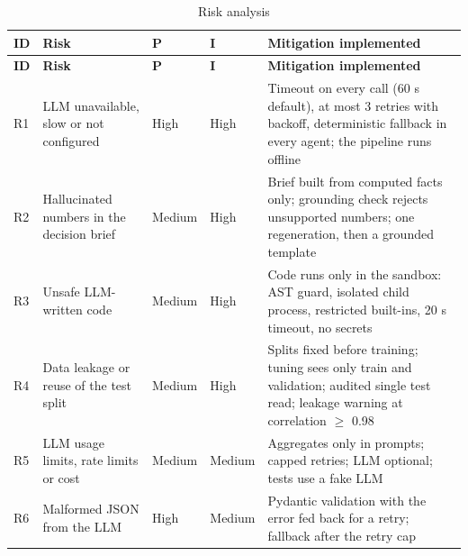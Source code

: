 \begingroup
\linespread{1}\small
\setlength{\tabcolsep}{4pt}
\begin{longtable}{|>{\raggedright\arraybackslash\hspace{0pt}}p{}|>{\raggedright\arraybackslash\hspace{0pt}}p{}|>{\raggedright\arraybackslash\hspace{0pt}}p{}|>{\raggedright\arraybackslash\hspace{0pt}}p{}|>{\raggedright\arraybackslash\hspace{0pt}}p{}|}
\caption{Risk analysis}\label{tab:3.2}\\
\hline
\rowcolor{tableheader}\textbf{ID} & \textbf{Risk} & \textbf{P} & \textbf{I} & \textbf{Mitigation implemented} \\
\hline
\endfirsthead
\hline
\rowcolor{tableheader}\textbf{ID} & \textbf{Risk} & \textbf{P} & \textbf{I} & \textbf{Mitigation implemented} \\
\endhead
R1 & LLM unavailable, slow or not configured & High & High & Timeout on every call (60 s default), at most 3 retries with backoff, deterministic fallback in every agent; the pipeline runs offline \\ \hline
R2 & Hallucinated numbers in the decision brief & Medium & High & Brief built from computed facts only; grounding check rejects unsupported numbers; one regeneration, then a grounded template \\ \hline
R3 & Unsafe LLM-written code & Medium & High & Code runs only in the sandbox: AST guard, isolated child process, restricted built-ins, 20 s timeout, no secrets \\ \hline
R4 & Data leakage or reuse of the test split & Medium & High & Splits fixed before training; tuning sees only train and validation; audited single test read; leakage warning at correlation \ensuremath{\geq} 0.98 \\ \hline
R5 & LLM usage limits, rate limits or cost & Medium & Medium & Aggregates only in prompts; capped retries; LLM optional; tests use a fake LLM \\ \hline
R6 & Malformed JSON from the LLM & High & Medium & Pydantic validation with the error fed back for a retry; fallback after the retry cap \\ \hline

\end{longtable}
